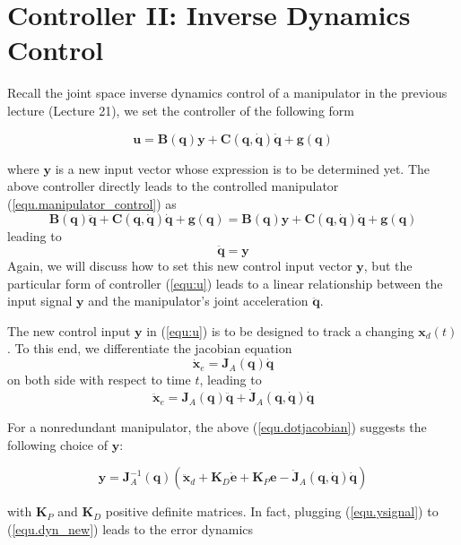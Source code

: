 \documentclass[10pt]{article}
\begin{document}
\section{Controller II: Inverse Dynamics Control}
Recall the joint space inverse dynamics control of a manipulator in the previous lecture (Lecture 21), we set the controller of the following form
\begin{shaded}
    \begin{equation}\label{equ:u}
    \boldsymbol{u}=\boldsymbol{B}(\boldsymbol{q}) \boldsymbol{y}+\boldsymbol{C}(\boldsymbol{q}, \dot{\boldsymbol{q}}) \dot{\boldsymbol{q}}+\boldsymbol{g}(\boldsymbol{q})
\end{equation}
\end{shaded}
where $\boldsymbol{y}$ is a new input vector whose expression is to be determined yet. The above controller directly leads to the controlled manipulator (\ref{equ.manipulator_control}) as
$$
 \boldsymbol{B}(\boldsymbol{q}) \ddot{\boldsymbol{q}}+\boldsymbol{C}(\boldsymbol{q}, \dot{\boldsymbol{q}}) \dot{\boldsymbol{q}}+\boldsymbol{g}(\boldsymbol{q})=\boldsymbol{B}(\boldsymbol{q}) \boldsymbol{y}+\boldsymbol{C}(\boldsymbol{q}, \dot{\boldsymbol{q}}) \dot{\boldsymbol{q}}+\boldsymbol{g}(\boldsymbol{q})
 $$
leading to 
\begin{equation}\label{equ.dyn_new}
\boldsymbol{\ddot{q}}=\boldsymbol{y} 
\end{equation}
Again, we will discuss how to set this new control input vector $\boldsymbol{y}$, but the particular form of controller (\ref{equ:u}) leads to a linear relationship between the input signal $\boldsymbol{y}$ and the manipulator's joint acceleration $\ddot{\boldsymbol{q}}$. 



The new control input $\boldsymbol{y}$ in (\ref{equ:u}) is to be designed to track a changing $\boldsymbol{x}_{d}(t)$. To this end, we differentiate the jacobian equation 
$$
\dot{\boldsymbol{x}}_e=\boldsymbol{J}_A(\boldsymbol{q})\dot{\boldsymbol{q}}
$$
on both side with respect to time $t$, leading to 
\begin{equation}\label{equ.dotjacobian}
    \ddot{\boldsymbol{x}}_{e}=\boldsymbol{J}_{A}(\boldsymbol{q}) \ddot{\boldsymbol{q}}+\dot{\boldsymbol{J}}_{A}(\boldsymbol{q}, \dot{\boldsymbol{q}}) \dot{\boldsymbol{q}}
\end{equation}



For a nonredundant manipulator, the above (\ref{equ.dotjacobian}) suggests the following choice of $\boldsymbol{y}$:
\begin{shaded}
    \begin{equation}\label{equ.ysignal}
    \boldsymbol{y}=\boldsymbol{J}_{A}^{-1}(\boldsymbol{q})\left(\ddot{\boldsymbol{x}}_{d}+\boldsymbol{K}_{D} \dot{{\boldsymbol{e}}}+\boldsymbol{K}_{P} {\boldsymbol{e}}-\dot{\boldsymbol{J}}_{A}(\boldsymbol{q}, \dot{\boldsymbol{q}}) \dot{\boldsymbol{q}}\right)
\end{equation}
\end{shaded}
with $\boldsymbol{K}_{P}$ and $\boldsymbol{K}_{D}$ positive definite  matrices. In fact, plugging (\ref{equ.ysignal}) to (\ref{equ.dyn_new}) leads to the  error dynamics
\end{document}
